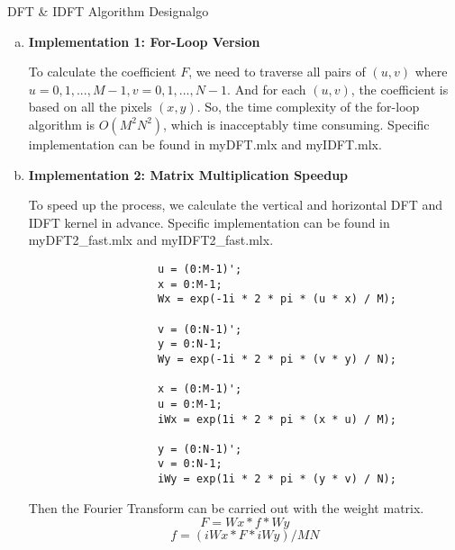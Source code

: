 \begin{problem}{DFT \& IDFT Algorithm Design}{algo}
\begin{enumerate}[(a)]
    
    \item \textbf{Implementation 1: For-Loop Version}
    
        To calculate the coefficient $F$, we need to traverse all pairs of $(u,v)$ where $u=0,1,...,M-1, v=0,1,...,N-1$. And for each $(u,v)$, the coefficient is based on all the pixels $(x,y)$. So, the time complexity of the for-loop algorithm is $O(M^2N^2)$, which is inacceptably time consuming.
        Specific implementation can be found in myDFT.mlx and myIDFT.mlx.
    \item \textbf{Implementation 2: Matrix Multiplication Speedup}
    
        To speed up the process, we calculate the vertical and horizontal DFT and IDFT kernel in advance.
        Specific implementation can be found in myDFT2\_fast.mlx and myIDFT2\_fast.mlx.
        \begin{verbatim}
                    u = (0:M-1)';
                    x = 0:M-1;
                    Wx = exp(-1i * 2 * pi * (u * x) / M);

                    v = (0:N-1)';
                    y = 0:N-1;
                    Wy = exp(-1i * 2 * pi * (v * y) / N);

                    x = (0:M-1)';
                    u = 0:M-1;
                    iWx = exp(1i * 2 * pi * (x * u) / M); 
                    
                    y = (0:N-1)';
                    v = 0:N-1;
                    iWy = exp(1i * 2 * pi * (y * v) / N);  
        \end{verbatim}
        Then the Fourier Transform can be carried out with the weight matrix.
        $$F = Wx * f * Wy$$
        $$f = (iWx * F * iWy) / MN$$
  
    
\end{enumerate}
\end{problem}
